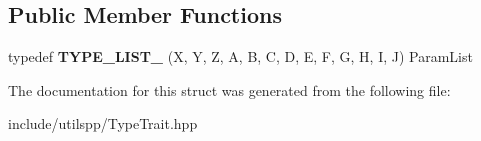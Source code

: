 \subsection*{Public Member Functions}
\begin{DoxyCompactItemize}
\item 
\hypertarget{structutilspp_1_1PointerOnMemberFunction_3_01W_07V_1_1_5_08_07X_00_01Y_00_01Z_00_01A_00_01B_00_0f132510bb9cf4ca10da452dc78c1be57_a08f54d09fbc674345448a771eec6d303}{typedef {\bfseries T\-Y\-P\-E\-\_\-\-L\-I\-S\-T\-\_} (X, Y, Z, A, B, C, D, E, F, G, H, I, J) Param\-List}\label{structutilspp_1_1PointerOnMemberFunction_3_01W_07V_1_1_5_08_07X_00_01Y_00_01Z_00_01A_00_01B_00_0f132510bb9cf4ca10da452dc78c1be57_a08f54d09fbc674345448a771eec6d303}

\end{DoxyCompactItemize}


The documentation for this struct was generated from the following file\-:\begin{DoxyCompactItemize}
\item 
include/utilspp/Type\-Trait.\-hpp\end{DoxyCompactItemize}

